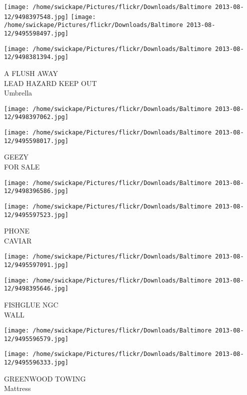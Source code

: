 \documentclass[10pt,letterpaper]{article}
\begin{document}
\texttt{[image: /home/swickape/Pictures/flickr/Downloads/Baltimore 2013-08-12/9498397548.jpg]}
\texttt{[image: /home/swickape/Pictures/flickr/Downloads/Baltimore 2013-08-12/9495598497.jpg]}

\texttt{[image: /home/swickape/Pictures/flickr/Downloads/Baltimore 2013-08-12/9498381394.jpg]}

A FLUSH AWAY\\
LEAD HAZARD KEEP OUT\\
Umbrella\\
\pagebreak

\texttt{[image: /home/swickape/Pictures/flickr/Downloads/Baltimore 2013-08-12/9498397062.jpg]}

\vspace{0.25in}
\texttt{[image: /home/swickape/Pictures/flickr/Downloads/Baltimore 2013-08-12/9495598017.jpg]}

GEEZY\\
FOR SALE\\
\pagebreak

\texttt{[image: /home/swickape/Pictures/flickr/Downloads/Baltimore 2013-08-12/9498396586.jpg]}

\vspace{0.25in}
\texttt{[image: /home/swickape/Pictures/flickr/Downloads/Baltimore 2013-08-12/9495597523.jpg]}

PHONE\\
CAVIAR\\
\pagebreak

\texttt{[image: /home/swickape/Pictures/flickr/Downloads/Baltimore 2013-08-12/9495597091.jpg]}

\vspace{0.25in}
\texttt{[image: /home/swickape/Pictures/flickr/Downloads/Baltimore 2013-08-12/9498395646.jpg]}

FISHGLUE NGC\\
WALL\\
\pagebreak

\texttt{[image: /home/swickape/Pictures/flickr/Downloads/Baltimore 2013-08-12/9495596579.jpg]}

\vspace{0.25in}
\texttt{[image: /home/swickape/Pictures/flickr/Downloads/Baltimore 2013-08-12/9495596333.jpg]}

GREENWOOD TOWING\\
Mattress\\
\pagebreak
\end{document}
